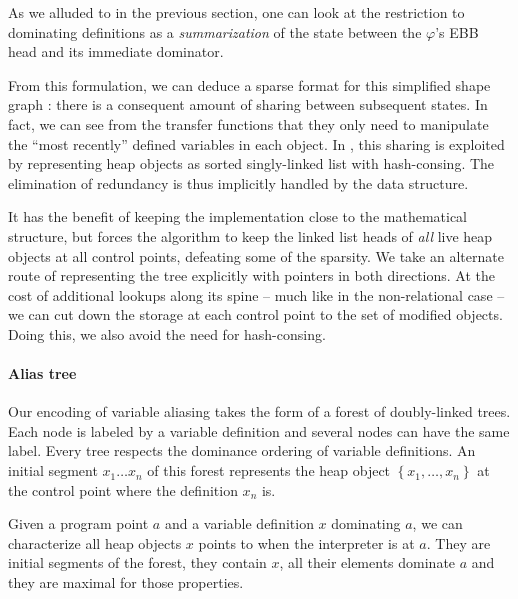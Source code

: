 \documentclass[11pt]{article}
\renewcommand{\phi}{\varphi}
\begin{document}
As we alluded to in the previous section, one can look at the restriction to dominating definitions as a \emph{summarization} of the state between the $\phi$'s EBB head and its immediate dominator.

From this formulation, we can deduce a sparse format for this simplified shape graph : there is a consequent amount of sharing between subsequent states. In fact, we can see from the transfer functions that they only need to manipulate the ``most recently'' defined variables in each object.
In \cite{ssa-alias}, this sharing is exploited by representing heap objects as sorted singly-linked list with hash-consing. The elimination of redundancy is thus implicitly handled by the data structure.

It has the benefit of keeping the implementation close to the mathematical structure, but forces the algorithm to keep the linked list heads of \emph{all} live heap objects at all control points, defeating some of the sparsity.
We take an alternate route of representing the tree explicitly with pointers in both directions. At the cost of additional lookups along its spine -- much like in the non-relational case -- we can cut down the storage at each control point to the set of modified objects. Doing this, we also avoid the need for hash-consing.

\paragraph{Alias tree} Our encoding of variable aliasing takes the form of a forest of doubly-linked trees.
Each node is labeled by a variable definition and several nodes can have the same label.
Every tree respects the dominance ordering of variable definitions.
An initial segment $x_1\dots x_n$ of this forest represents the heap object $\left\{x_1,\dots,x_n\right\}$ at the control point where the definition $x_n$ is.

Given a program point $a$ and a variable definition $x$ dominating $a$, we can characterize all heap objects $x$ points to when the interpreter is at $a$. They are initial segments of the forest, they contain $x$, all their elements dominate $a$ and they are maximal for those properties.
\end{document}
